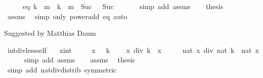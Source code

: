 \begin{isabellebody}
%
\isadelimproof
%
\endisadelimproof
%
\isatagproof
{}\isamarkupfalse%
\ {\isacharminus}{\kern0pt}\isanewline
\ \ \isamarkupfalse%
\ eq{\isacharcolon}{\kern0pt}\ {\isachardoublequoteopen}k\ {\isacharcircum}{\kern0pt}\ m\ {\isacharequal}{\kern0pt}\ k\ {\isacharcircum}{\kern0pt}\ {\isacharparenleft}{\kern0pt}{\isacharparenleft}{\kern0pt}m\ {\isacharminus}{\kern0pt}\ Suc\ {}{\isacharparenright}{\kern0pt}\ {\isacharplus}{\kern0pt}\ Suc\ {}{\isacharparenright}{\kern0pt}{\isachardoublequoteclose}\isanewline
\ \ \ \ \isamarkupfalse%
\ {\isacharparenleft}{\kern0pt}simp\ add{\isacharcolon}{\kern0pt}\ assms{\isacharparenright}{\kern0pt}\isanewline
\ \ \isamarkupfalse%
\ {\isacharquery}{\kern0pt}thesis\isanewline
\ \ \ \ \isamarkupfalse%
\ assms\ \isamarkupfalse%
\ {\isacharparenleft}{\kern0pt}simp\ only{\isacharcolon}{\kern0pt}\ power{\isacharunderscore}{\kern0pt}add\ eq{\isacharparenright}{\kern0pt}\ auto\isanewline
{}\isamarkupfalse%
%
\endisatagproof
{\isafoldproof}%
%
\isadelimproof
%
\endisadelimproof
%
\begin{isamarkuptext}%
Suggested by Matthias Daum%
\end{isamarkuptext}\isamarkuptrue%
\isamarkupfalse%
\ int{\isacharunderscore}{\kern0pt}div{\isacharunderscore}{\kern0pt}less{\isacharunderscore}{\kern0pt}self{\isacharcolon}{\kern0pt}\isanewline
\ \ \ x{\isacharcolon}{\kern0pt}{\isacharcolon}{\kern0pt}int\isanewline
\ \ \ {\isachardoublequoteopen}{}\ {\isacharless}{\kern0pt}\ x{\isachardoublequoteclose}\ {\isachardoublequoteopen}{}\ {\isacharless}{\kern0pt}\ k{\isachardoublequoteclose}\isanewline
\ \ \ \ {\isachardoublequoteopen}x\ div\ k\ {\isacharless}{\kern0pt}\ x{\isachardoublequoteclose}\isanewline
%
\isadelimproof
%
\endisadelimproof
%
\isatagproof
{}\isamarkupfalse%
\ {\isacharminus}{\kern0pt}\isanewline
\ \ \isamarkupfalse%
\ {\isachardoublequoteopen}nat\ x\ div\ nat\ k\ {\isacharless}{\kern0pt}\ nat\ x{\isachardoublequoteclose}\isanewline
\ \ \ \ \isamarkupfalse%
\ {\isacharparenleft}{\kern0pt}simp\ add{\isacharcolon}{\kern0pt}\ assms{\isacharparenright}{\kern0pt}\isanewline
\ \ \isamarkupfalse%
\ assms\ \isamarkupfalse%
\ {\isacharquery}{\kern0pt}thesis\isanewline
\ \ \ \ \isamarkupfalse%
\ {\isacharparenleft}{\kern0pt}simp\ add{\isacharcolon}{\kern0pt}\ nat{\isacharunderscore}{\kern0pt}div{\isacharunderscore}{\kern0pt}distrib\ {\isacharbrackleft}{\kern0pt}symmetric{\isacharbrackright}{\kern0pt}{\isacharparenright}{\kern0pt}\isanewline

\end{isabellebody}
